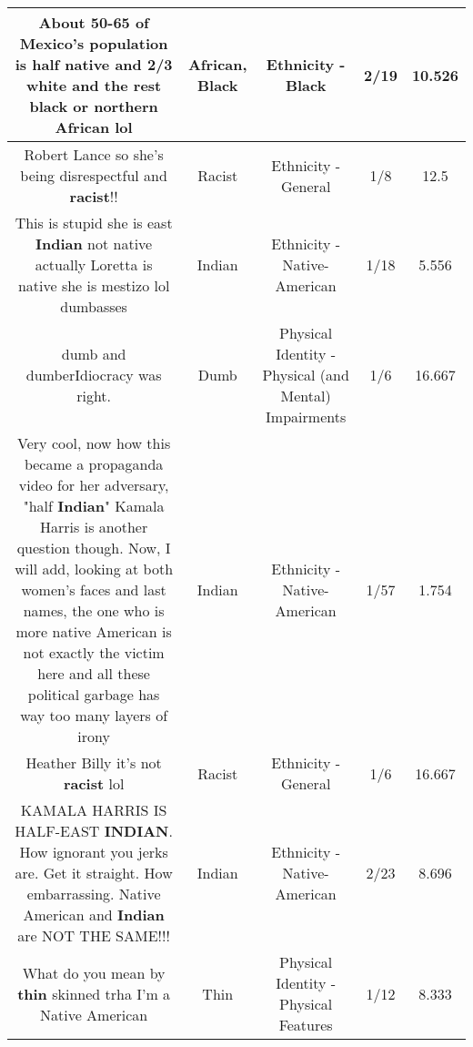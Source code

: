 \documentclass[11pt]{article}
\newlength\mylength
\begin{document}
\begin{center}
\begin{longtable}{|C{.65\mylength}|C{.30\mylength}|C{.12\mylength}|C{.12\mylength}|C{.12\mylength}|}
  \small About 50-65 of Mexico's population is half native and 2/3 white and the rest \textbf{black} or northern \textbf{African} lol\normalsize   & African, Black & Ethnicity - Black & 2/19 & 10.526 \\  \hline
  \small Robert Lance so she's being disrespectful and \textbf{racist}!!\normalsize   & Racist & Ethnicity - General & 1/8 & 12.5 \\  \hline
  \small This is stupid she is east \textbf{Indian} not native actually Loretta is native she is mestizo lol dumbasses\normalsize   & Indian & Ethnicity - Native-American & 1/18 & 5.556 \\  \hline
  \small dumb and dumberIdiocracy was right.\normalsize   & Dumb & Physical Identity - Physical (and Mental) Impairments & 1/6 & 16.667 \\  \hline
  \small Very cool, now how this became a propaganda video for her adversary, "half \textbf{Indian}" Kamala Harris is another question though. Now, I will add, looking at both women's faces and last names, the one who is more native American is not exactly the victim here and all these political garbage has way too many layers of irony\normalsize   & Indian & Ethnicity - Native-American & 1/57 & 1.754 \\  \hline
  \small Heather Billy it's not \textbf{racist} lol\normalsize   & Racist & Ethnicity - General & 1/6 & 16.667 \\  \hline
  \small KAMALA HARRIS IS HALF-EAST \textbf{INDIAN}.  How ignorant you jerks are. Get it straight. How embarrassing.  Native American and \textbf{Indian} are NOT THE SAME!!!\normalsize   & Indian & Ethnicity - Native-American & 2/23 & 8.696 \\  \hline
  \small What do you mean by \textbf{thin} skinned trha I'm a Native American\normalsize   & Thin & Physical Identity - Physical Features & 1/12 & 8.333 \\  \hline

\end{longtable}
\end{center}
\end{document}
